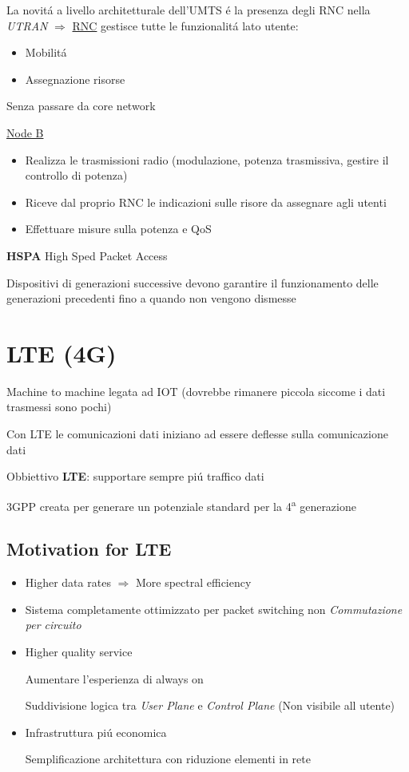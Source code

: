 \documentclass{article}
\begin{document}
La novit\'a a livello architetturale dell'UMTS \'e la presenza degli RNC nella \textit{UTRAN} $\Rightarrow$ \underline{RNC} gestisce tutte le funzionalit\'a lato utente:
\begin{itemize}
    \item Mobilit\'a
    \item Assegnazione risorse
\end{itemize}

Senza passare da core network

\underline{Node B}
\begin{itemize}
    \item Realizza le trasmissioni radio (modulazione, potenza trasmissiva, gestire il controllo di potenza)
    \item Riceve dal proprio RNC le indicazioni sulle risore da assegnare agli utenti

    \item Effettuare misure sulla potenza e QoS
\end{itemize}


\textbf{HSPA} High Sped Packet Access

Dispositivi di generazioni successive devono garantire il funzionamento delle generazioni precedenti fino a quando non vengono dismesse

\section{LTE (4G)}


Machine to machine legata ad IOT (dovrebbe rimanere piccola siccome i dati trasmessi sono pochi)

Con LTE le comunicazioni dati iniziano ad essere deflesse sulla comunicazione dati


Obbiettivo \textbf{LTE}: supportare sempre pi\'u traffico dati

3GPP creata per generare un potenziale standard per la 4\textsuperscript{a} generazione

\subsection{Motivation for LTE}
\begin{itemize}
    \item Higher data rates $\Rightarrow$ More spectral efficiency
    \item  Sistema completamente ottimizzato per packet switching non \textit{Commutazione per circuito}
    \item Higher quality service

        Aumentare l'esperienza di always on

        Suddivisione logica  tra \textit{User Plane} e \textit{Control Plane} (Non visibile all
        utente)
    \item Infrastruttura pi\'u economica

        Semplificazione architettura con riduzione elementi in rete
\end{itemize}
\end{document}
